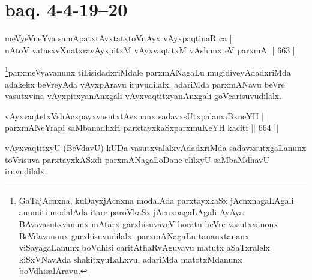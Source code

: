 \section*{baq. 4-4-19--20}

\begin{shl}
meVyeVneYva samApatxtAvxtatxtoV\s nAyx vAyxpaqtinaR ca || \\
nAtoV vatasxvXnatxravAyxpitxM vAyxvaqtitxM vA\s shunxteV parxmA ||  663 ||  
\end{shl}

\begin{artha}
\footnote[1]{GaTajAcnxna, kuDayxjAcnxna modalAda parxtayxkaSx jAcnxnagaLAgali anumiti modalAda itare paroVkaSx jAcnxnagaLAgali AyAya BAvavasutxvanunx mAtarx garxhisuvaveV horatu beVre vasutxvanonx BeVdavanonx garxhisuvudilalx. parxmANagaLu tananxtananx viSayagaLanunx boVdhisi caritAthaRvAguvavu matutx aSaTxralelx kiSxVNavAda shakitxyuLaLxvu, adariMda matotxMdanunx boVdhisalAravu.}parxmeVyavanunx tiLisidadxriMdale parxmANagaLu mugidiveyAdadxriMda adakekx beVreyAda vAyxpAravu iruvudilalx. adariMda parxmANavu beVre vasutxvina vAyxpitxyanAnxgali vAyxvaqtitxyanAnxgali goVcarisuvudilalx.
\end{artha}

\begin{shl}
vAyxvaqtetxVshAcxpayxvasutxtAvxnanx sadavxsUtxpalamaBxneYH || \\
parxmANeYrapi saMbanadhxH parxtayxkaSxparxmuKeYH kacitf ||  664 ||  
\end{shl}

\begin{artha}
vAyxvaqtitxyU (BeVdavU) kUDa vasutxvalalxvAdadxriMda 
sadavxsutxgaLanunx toVrisuva parxtayxkASxdi parxmANagaLoDane elilxyU 
saMbaMdhavU iruvudilalx.
\end{artha}

